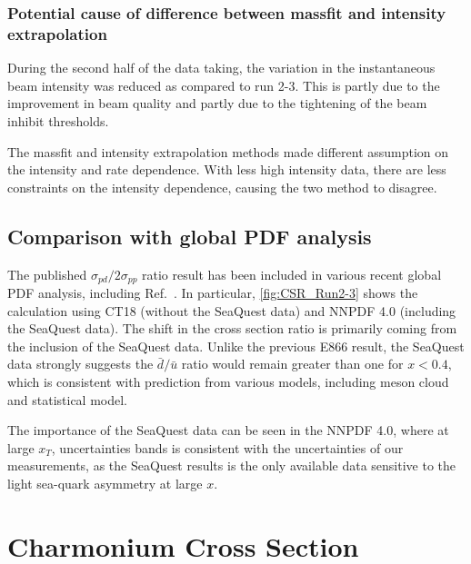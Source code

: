 \documentclass[../main.tex]{subfiles}
\begin{document}
\subsubsection{Potential cause of difference between massfit and intensity extrapolation}
During the second half of the data taking, the variation in the instantaneous beam 
intensity was reduced as compared to run 2-3. This is partly due to the improvement
in beam quality and partly due to the tightening of the beam inhibit thresholds.

The massfit and intensity extrapolation methods made different assumption on the intensity 
and rate dependence. With less high intensity data, there are less constraints on the 
intensity dependence, causing the two method to disagree.


\subsection{Comparison with global PDF analysis}
The published $\sigma_{pd}/2\sigma_{pp}$ ratio result has been included in various recent global 
PDF analysis, including Ref.~\cite{accardi2023,ball2022a,cocuzza2021}. 
In particular, \cref{fig:CSR_Run2-3} shows the calculation using CT18 (without the SeaQuest data) 
and NNPDF 4.0 (including the SeaQuest data). The shift in the cross section ratio is primarily
coming from the inclusion of the SeaQuest data. Unlike the previous E866 result, the SeaQuest data
strongly suggests the $\bar{d}/\bar{u}$ ratio would remain greater than one for $x<0.4$, which is 
consistent with prediction from various models, including meson cloud and statistical model. 

The importance of the SeaQuest data can be seen in the NNPDF 4.0, where at large $x_T$,
uncertainties bands is consistent with the uncertainties of our measurements, as the SeaQuest
results is the only available data sensitive to the light sea-quark asymmetry at large $x$.

 
\FloatBarrier
\section{Charmonium Cross Section}
\end{document}
